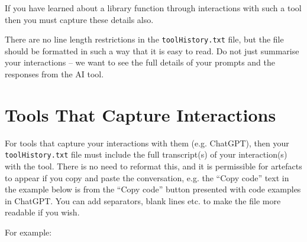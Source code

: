 \documentclass{article}
\begin{document}
If you have learned about a library function through interactions with such a tool then you must capture these details also.

There are no line length restrictions in the \texttt{toolHistory.txt} file,
but the file should be formatted in such a way that it is easy to read. 
Do not just summarise your interactions -- we want to see the full details of your prompts and the responses from the AI tool.

\section{Tools That Capture Interactions}

For tools that capture your interactions with them (e.g. ChatGPT), then your \texttt{toolHistory.txt} file must include the full transcript(s) 
of your interaction(s) with the tool. There is no need to reformat this, and it is permissible for artefacts to appear if you copy and 
paste the conversation, e.g. the ``Copy code'' text  in the example below is from the ``Copy code'' button presented with code examples
in ChatGPT. You can add separators, blank lines etc. to make the file more readable if you wish.

For example:
\end{document}
